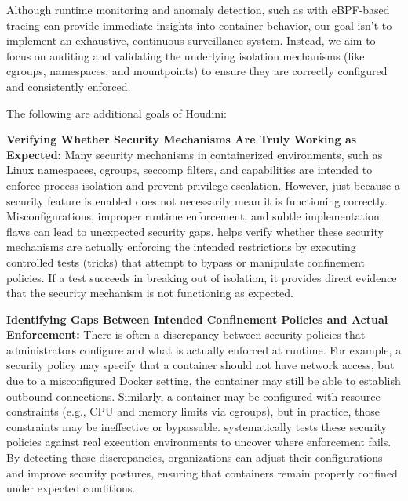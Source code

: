 Although runtime monitoring and anomaly detection, such as with eBPF-based tracing can provide immediate insights into container behavior, our goal isn't to implement an exhaustive, continuous surveillance system. Instead, we aim to focus on auditing and validating the underlying isolation mechanisms (like cgroups, namespaces, and mountpoints) to ensure they are correctly configured and consistently enforced.

The following are additional goals of Houdini:

\textbf{Verifying Whether Security Mechanisms Are Truly Working as Expected:}
Many security mechanisms in containerized environments, such as Linux namespaces, cgroups, seccomp filters, and capabilities are intended to enforce process isolation and prevent privilege escalation. However, just because a security feature is enabled does not necessarily mean it is functioning correctly. Misconfigurations, improper runtime enforcement, and subtle implementation flaws can lead to unexpected security gaps. \houdini helps verify whether these security mechanisms are actually enforcing the intended restrictions by executing controlled tests (tricks) that attempt to bypass or manipulate confinement policies. If a test succeeds in breaking out of isolation, it provides direct evidence that the security mechanism is not functioning as expected.


\textbf{Identifying Gaps Between Intended Confinement Policies and Actual Enforcement:}
There is often a discrepancy between security policies that administrators configure and what is actually enforced at runtime. For example, a security policy may specify that a container should not have network access, but due to a misconfigured Docker setting, the container may still be able to establish outbound connections. Similarly, a container may be configured with resource constraints (e.g., CPU and memory limits via cgroups), but in practice, those constraints may be ineffective or bypassable. \houdini systematically tests these security policies against real execution environments to uncover where enforcement fails. By detecting these discrepancies, organizations can adjust their configurations and improve security postures, ensuring that containers remain properly confined under expected conditions.


